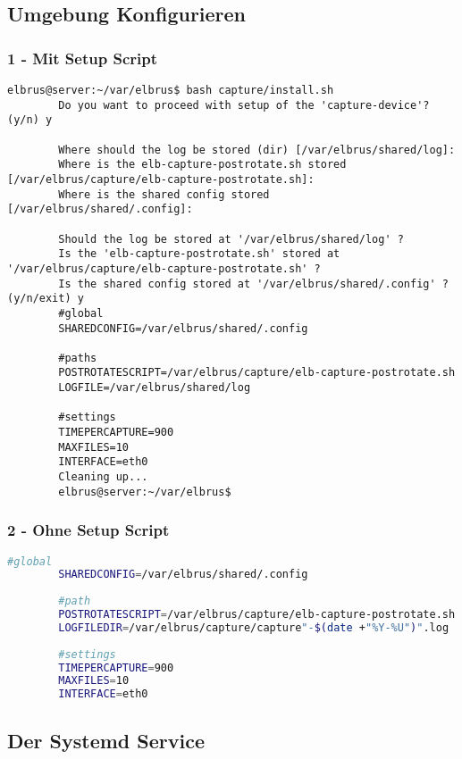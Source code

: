 	\subsection[file config]{Umgebung Konfigurieren}
	\subsubsection{1 - Mit Setup Script}
	
	\lstset{style=commands}
	\begin{lstlisting}[caption={Ausführen des 'install.sh' Scripts.}, breaklines=true,]
		elbrus@server:~/var/elbrus$ bash capture/install.sh
		Do you want to proceed with setup of the 'capture-device'? (y/n) y
		
		Where should the log be stored (dir) [/var/elbrus/shared/log]:
		Where is the elb-capture-postrotate.sh stored [/var/elbrus/capture/elb-capture-postrotate.sh]:
		Where is the shared config stored [/var/elbrus/shared/.config]:
		
		Should the log be stored at '/var/elbrus/shared/log' ?
		Is the 'elb-capture-postrotate.sh' stored at '/var/elbrus/capture/elb-capture-postrotate.sh' ?
		Is the shared config stored at '/var/elbrus/shared/.config' ? (y/n/exit) y
		#global
		SHAREDCONFIG=/var/elbrus/shared/.config
		
		#paths
		POSTROTATESCRIPT=/var/elbrus/capture/elb-capture-postrotate.sh
		LOGFILE=/var/elbrus/shared/log
		
		#settings
		TIMEPERCAPTURE=900
		MAXFILES=10
		INTERFACE=eth0
		Cleaning up...
		elbrus@server:~/var/elbrus$
	\end{lstlisting}
	
	\subsubsection{2 - Ohne Setup Script}
	
	\lstset{style=files}
	\begin{lstlisting}[caption={Anhand von '.env.example' eigene '.env' Datei anlegen.}, language=bash]
		#global
		SHAREDCONFIG=/var/elbrus/shared/.config
		
		#path
		POSTROTATESCRIPT=/var/elbrus/capture/elb-capture-postrotate.sh
		LOGFILEDIR=/var/elbrus/capture/capture"-$(date +"%Y-%U")".log
		
		#settings
		TIMEPERCAPTURE=900
		MAXFILES=10
		INTERFACE=eth0
	\end{lstlisting}
	\newpage
	
	\subsection[systemd service]{Der Systemd Service}
	
